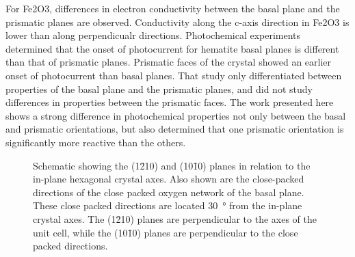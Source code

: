 \documentclass[12pt,%
              twoside,
               letterpaper]{uiothesis}
\begin{document}
For Fe2O3, differences in electron conductivity between the basal plane and the
prismatic planes are observed. Conductivity along the c-axis direction in Fe2O3 is
lower than along perpendicualr directions.\cite{Huda:2010kx,Iordanova:2005ha}
Photochemical experiments determined that the onset of photocurrent for hematite basal
planes is different than that of prismatic planes.\cite{Eggleston:2009ic} Prismatic faces
of the crystal showed an earlier onset of photocurrent than basal planes. That study only
differentiated between properties of the basal plane and the prismatic planes, and did not
study differences in properties between the prismatic faces. The work presented here shows
a strong difference in photochemical properties not only between the basal and prismatic
orientations, but also determined that one prismatic orientation is significantly more
reactive than the others. 

\begin{figure}
\begin{center}
\caption[(1\={2}10) and (10\={1}0) planes in relation to in-plane crystal axes]{%
	Schematic showing the (1\={2}10) and (10\={1}0) planes in 
	relation to the in-plane hexagonal crystal axes. Also shown 
	are the close-packed directions of the close packed oxygen 
	network of the basal plane. These close packed directions are 
	located \SI{30}{\degree} from the in-plane crystal axes. The 
	(1\={2}10) planes are perpendicular to the axes of the unit 
	cell, while the (10\={1}0) planes are perpendicular to the 
	close packed directions.
}
\label{fig:fe2o3axes}
\end{center}
\end{figure}
			
\end{document}
